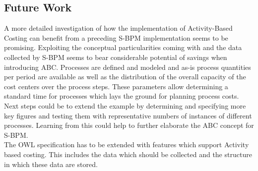 \subsection{ Future Work}
A more detailed investigation of how the implementation of Activity-Based Costing can benefit from a preceding S-BPM implementation seems to be promising. Exploiting the conceptual particularities coming with and the data collected by S-BPM seems to bear considerable potential of savings when introducing ABC. Processes are defined and modeled and as-is process quantities per period are available as well as the distribution of the overall capacity of the cost centers over the process steps. These parameters allow determining a standard time for processes which lays the ground for planning process costs.
Next steps could be to extend the example by determining and specifying more key figures and testing them with representative numbers of instances of different processes. Learning from this could help to further elaborate the ABC concept for S-BPM.\\
The OWL specification has to be extended with features which support Activity based costing. This includes the data which should be collected and the structure in which these data are stored.

